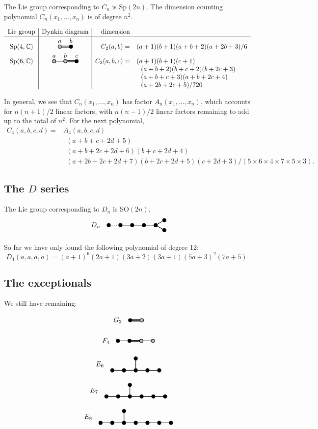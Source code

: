 \documentclass[11pt,oneside]{article}
\newcommand{\Complex}{\mathbb{C}}
\newcommand{\SO}{\mathrm{SO}}
\newcommand{\Sp}{\mathrm{Sp}}
\begin{document}
The Lie group corresponding to $C_n$ is $\Sp(2n).$
The dimension counting polynomial $C_n(x_1,...,x_n)$ is
of degree $n^2.$

$$
\begin{array}{c|c|rl}
\text{Lie group} & \text{Dynkin diagram} & \text{dimension} & \\
\hline
\Sp(4,\Complex) & \DynkinCab  & C_2(a,b) =& (a+1)(b+1)(a+b+2)(a+2b+3)/6 \\
\Sp(6,\Complex) & \DynkinCabc & C_3(a,b,c) =& (a+1)(b+1)(c+1) \\
                             & & &\ \ (a+b+2)(b+c+2)(b+2c+3)\\
                             & & &\ \ (a+b+c+3)(a+b+2c+4)\\
            & & &\ \ (a+2b+2c+5)/720 \\
\end{array}
$$

In general, we see that $C_n(x_1,...,x_n)$ has factor $A_n(x_1,...,x_n)$,
which accounts for $n(n+1)/2$ linear factors, with $n(n-1)/2$ linear
factors remaining to add up to the total of $n^2$.
For the next polynomial,
\begin{align*}
C_4(a, b, c, d) =& A_4(a, b, c, d) \\
    &\ \  (a+b+c+2d+5) \\
    &\ \  (a+b+2c+2d+6)(b+c+2d+4) \\
    &\ \  (a+2b+2c+2d+7)(b+2c+2d+5)(c+2d+3)/(5\times 6\times 4\times 7\times 5\times 3).
\end{align*}

\subsection{The $D$ series}

The Lie group corresponding to $D_n$ is $\SO(2n).$
$$
\DynkinDn
$$

So far we have only found the following polynomial of degree 12:
$$
D_4(a, a, a, a) = (a+1)^6(2a+1)(3a+2)(3a+1)(5a+3)^2(7a+5).
$$

\subsection{The exceptionals}

We still have remaining: %

$$
\DynkinGtwo
$$

$$
\DynkinFfour
$$

$$
\DynkinEsix
$$

$$
\DynkinEseven
$$

$$
\DynkinEeight
$$


{}

\end{document}
